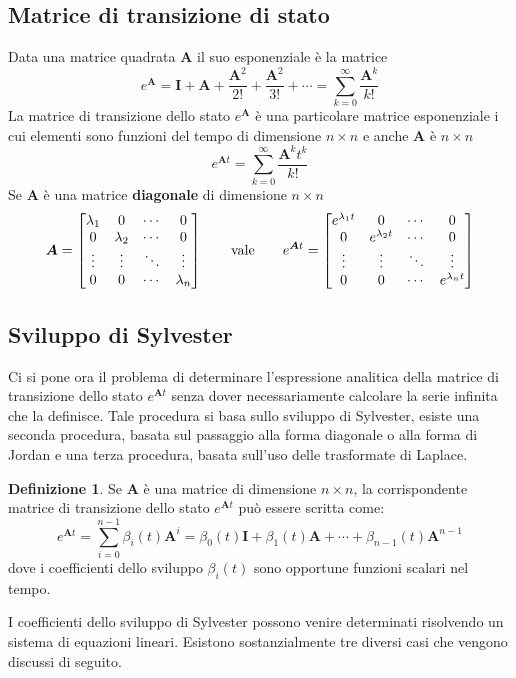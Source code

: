 \documentclass[a4paper]{article}
\renewcommand{\vec}{\bm}
\theoremstyle{definition}
\newtheorem{defn}{Definizione}[subsection]
\begin{document}
		\subsection{Matrice di transizione di stato}
			Data una matrice quadrata $ \vec{A} $ il suo esponenziale è la matrice
			\[
				e^{\vec{A}} = \vec{I} + \vec{A} + \dfrac{\vec{A}^2}{2!} + \dfrac{\vec{A}^2}{3!} + \cdots =
				\sum_{k = 0}^{\infty} \dfrac{\vec{A}^k }{k!}
			\]
			La matrice di transizione dello stato $ e^{\vec{A}} $ è una particolare matrice esponenziale i cui elementi sono funzioni del tempo di dimensione $ n\times n $ e anche $ \vec{A} $ è $ n\times n $
			\[
				e^{\vec{A}t} = \sum_{k=0}^{\infty} \dfrac{\vec{A}^k t^k}{k!}
			\]
			Se $ \vec{A} $ è una matrice \textbf{diagonale} di dimensione $ n\times n $
			\[
				\vec{A} = 
				\begin{bmatrix}
					\lambda_1 & 0 & \cdots & 0 \\
					0 & \lambda_2 & \cdots & 0 \\
					\vdots & \vdots & \ddots & \vdots \\
					0 & 0 & \cdots & \lambda_n 
				\end{bmatrix}
				\qquad
				\textup{vale}
				\qquad
				e^{\vec{A}t} =
				\begin{bmatrix}
					e^{\lambda_1 t} & 0 & \cdots & 0 \\
					0 & e^{\lambda_2 t} & \cdots & 0 \\
					\vdots & \vdots & \ddots & \vdots \\
					0 & 0 & \cdots & e^{\lambda_n t}
				\end{bmatrix}
			\]
			
			
		\subsection{Sviluppo di Sylvester}
			Ci si pone ora il problema di determinare l'espressione analitica della matrice di transizione dello stato $ e^{\vec{A}t} $ senza dover necessariamente calcolare la serie infinita che la
			definisce. Tale procedura si basa sullo sviluppo di Sylvester, esiste una seconda procedura, basata sul passaggio alla forma diagonale o alla forma di Jordan e una terza procedura, basata sull'uso delle
			trasformate di Laplace.
			
			\begin{defn}
				Se $ \vec{A} $ è una matrice di dimensione $ n\times n $, la corrispondente matrice di transizione dello stato $ e^{\vec{A}t} $ può essere scritta come:
				\[
					e^{\vec{A}t} = \sum_{i = 0}^{n - 1} \beta_i (t)\vec{A}^i = 
					\beta_0 (t)\vec{I} + \beta_1(t)\vec{A} + \cdots + \beta_{n-1}(t)\vec{A}^{n-1}
				\]
				dove i coefficienti dello sviluppo $ \beta_i(t) $ sono opportune funzioni scalari nel tempo.			
			\end{defn}
			I coefficienti dello sviluppo di Sylvester possono venire determinati risolvendo un
			sistema di equazioni lineari. Esistono sostanzialmente tre diversi casi che vengono discussi di seguito.
			
\end{document}
